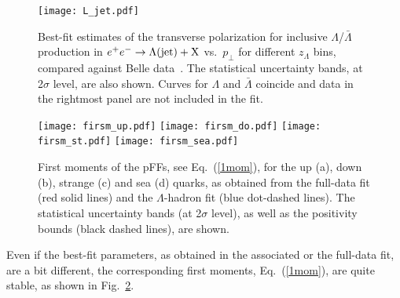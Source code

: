 \documentclass[submission, Proceedings]{SciPost}
\begin{document}
\begin{figure}[!b]
\centering
\texttt{[image: L\_jet.pdf]}
\caption{Best-fit estimates of the transverse polarization for inclusive $\Lambda$/$\bar\Lambda$ production in $e^+e^-\to \Lambda(\rm{jet}) + X$ vs.~$p_\perp$ for different $z_\Lambda$ bins, compared against Belle data~\cite{Guan:2018ckx}. The statistical uncertainty bands, at 2$\sigma$ level, are also shown. Curves for $\Lambda$ and $\bar\Lambda$ coincide and data in the rightmost panel are not included in the fit.}
\label{fig:Lj}
\end{figure}

\begin{figure}[!thb]
\centering
\texttt{[image: firsm\_up.pdf]}
\texttt{[image: firsm\_do.pdf]}
\texttt{[image: firsm\_st.pdf]}
\texttt{[image: firsm\_sea.pdf]}
\caption{First moments of the pFFs, see Eq.~(\ref{1mom}), for the up (a), down (b), strange (c) and sea (d) quarks, as obtained from the full-data fit (red solid lines) and the $\Lambda$-hadron fit (blue dot-dashed lines). The statistical uncertainty bands (at 2$\sigma$ level), as well as the positivity bounds (black dashed lines), are shown.}
\label{fig:1stm}
\end{figure}

Even if the best-fit parameters, as obtained in the associated or the full-data fit, are a bit different, the corresponding first moments, Eq.~(\ref{1mom}), are quite stable, as shown in Fig.~\ref{fig:1stm}.
\end{document}
